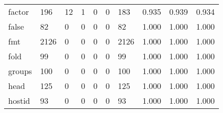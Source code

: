 \begin{longtable}{lp{2.0cm}p{2.0cm}p{2.0cm}p{2.0cm}p{2.0cm}p{2.0cm}p{2.0cm}p{2.0cm}p{2.0cm}}
factor    &                    196 &                                 12 &                                 1 &                                0 &                                 0 &                             183 &                                0.935 &                                  0.939 &                                0.934 \\
false     &                     82 &                                  0 &                                 0 &                                0 &                                 0 &                              82 &                                1.000 &                                  1.000 &                                1.000 \\
fmt       &                   2126 &                                  0 &                                 0 &                                0 &                                 0 &                            2126 &                                1.000 &                                  1.000 &                                1.000 \\
fold      &                     99 &                                  0 &                                 0 &                                0 &                                 0 &                              99 &                                1.000 &                                  1.000 &                                1.000 \\
groups    &                    100 &                                  0 &                                 0 &                                0 &                                 0 &                             100 &                                1.000 &                                  1.000 &                                1.000 \\
head      &                    125 &                                  0 &                                 0 &                                0 &                                 0 &                             125 &                                1.000 &                                  1.000 &                                1.000 \\
hostid    &                     93 &                                  0 &                                 0 &                                0 &                                 0 &                              93 &                                1.000 &                                  1.000 &                                1.000 \\

\end{longtable}
